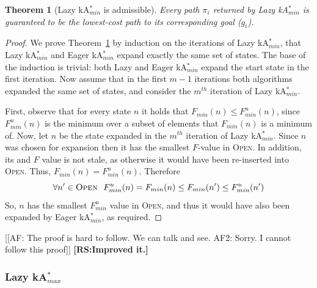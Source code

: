 \documentclass{aicom2e}
\newtheorem{theorem}{Theorem}
\newcommand{\kastarmin}{kA$^*_{min}$}
\newcommand{\kastarmax}{kA$^*_{max}$}
\newcommand{\open}{\textsc{Open}}
\newcommand{\roni}[1]{\textbf{[RS:#1]}}
\begin{document}
\begin{theorem}[Lazy \kastarmin{} is admissible]
Every path $\pi_i$ returned by Lazy \kastarmin{} is guaranteed to be the
lowest-cost path to its corresponding goal ($g_i$).
\label{the:lazy-minf-correct}
\end{theorem}
\begin{proof}
We prove Theorem~\ref{the:lazy-minf-correct} by induction on the iterations
of Lazy \kastarmin{}, that Lazy \kastarmin{} and Eager \kastarmin{} expand exactly the same set of states. 
The base of the induction is trivial: both Lazy and Eager \kastarmin{} expand the start state in the first iteration. 
Now assume that in the first $m-1$ iterations both algorithms expanded the same set of states, 
and consider the $m^{th}$ iteration of Lazy \kastarmin{}. 

First, observe that for every state $n$ it holds that $F_{min}(n)\leq F^u_{min}(n)$, since $F^u_{min}(n)$ is the minimum over a subset of elements that $F_{min}(n)$ is a minimum of. 
Now, let $n$ be the state expanded in the $m^{th}$ iteration of Lazy \kastarmin{}. 
Since $n$ was chosen for expansion then it has the smallest $F$-value in \open{}. 
In addition, its and $F$ value is not stale, as otherwise it
would have been re-inserted into \open{}. Thus, $F_{min}(n)=F^u_{min}(n)$. 
Therefore
\[ \forall n'\in\open{} ~~ F^u_{min}(n)=F_{min}(n)\leq F_{min}(n') \leq F^u_{min}(n') \]
    So, $n$ has the smallest $F^u_{min}$ value in \open{}, and thus it would have also been expanded by Eager \kastarmin{}, as required. 
\end{proof}
[[AF: The proof is hard to follow. We can talk and see. AF2: Sorry. I cannot
follow this proof]]
\roni{Improved it.}




\subsubsection{Lazy \kastarmax{}}
\end{document}
